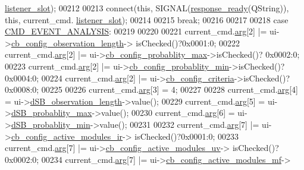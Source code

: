 \begin{DoxyCode}
      \hyperlink{a00004_abb76d8edb39876deb60975c8fd784b3f}{listener\_slot});
00212 
00213             connect(\textcolor{keyword}{this}, SIGNAL(\hyperlink{a00017_a3f6396874778799cf07a7a0149e54977}{response\_ready}(QString)), \textcolor{keyword}{this}, current\_cmd.
      \hyperlink{a00004_abb76d8edb39876deb60975c8fd784b3f}{listener\_slot});
00214 
00215         \textcolor{keywordflow}{break};
00216 
00217 
00218     \textcolor{keywordflow}{case} \hyperlink{a00086_a3a15793e3ab7817f2429edf04de693a0}{CMD\_EVENT\_ANALYSIS}:
00219 
00220 
00221             current\_cmd.\hyperlink{a00004_a56e6c2d7315d0ae60a51e8b140c9cfe4}{arg}[2]     |= ui->\hyperlink{a00080_ae9e8f3f0d147a4cd21c8f36ffb3bd81f}{cb\_config\_observation\_length}->
      isChecked()?0x0001:0;
00222             current\_cmd.\hyperlink{a00004_a56e6c2d7315d0ae60a51e8b140c9cfe4}{arg}[2]     |= ui->\hyperlink{a00080_ad0a7ea02564c112595f0d30efa75eef2}{cb\_config\_probablity\_max}->isChecked()?
      0x0002:0;
00223             current\_cmd.\hyperlink{a00004_a56e6c2d7315d0ae60a51e8b140c9cfe4}{arg}[2]     |= ui->\hyperlink{a00080_a6e32cc42adcf308df94cbbc9ac226f50}{cb\_config\_probablity\_min}->isChecked()?
      0x0004:0;
00224             current\_cmd.\hyperlink{a00004_a56e6c2d7315d0ae60a51e8b140c9cfe4}{arg}[2]     |= ui->\hyperlink{a00080_a89574c631636929702a5928b2a159892}{cb\_config\_criteria}->isChecked()?0x0008:0;
00225 
00226             current\_cmd.\hyperlink{a00004_a56e6c2d7315d0ae60a51e8b140c9cfe4}{arg}[3]      = 4;
00227 
00228             current\_cmd.\hyperlink{a00004_a56e6c2d7315d0ae60a51e8b140c9cfe4}{arg}[4]      = ui->\hyperlink{a00080_a1fe1bf902f2a365c4c94612d2a2ffbcc}{dSB\_observation\_length}->value();
00229             current\_cmd.\hyperlink{a00004_a56e6c2d7315d0ae60a51e8b140c9cfe4}{arg}[5]      = ui->\hyperlink{a00080_a137b79e810736643ac4b15e221909871}{dSB\_probablity\_max}->value();
00230             current\_cmd.\hyperlink{a00004_a56e6c2d7315d0ae60a51e8b140c9cfe4}{arg}[6]      = ui->\hyperlink{a00080_adfd6cf470c736f358c6982f9a635f04f}{dSB\_probablity\_min}->value();
00231 
00232             current\_cmd.\hyperlink{a00004_a56e6c2d7315d0ae60a51e8b140c9cfe4}{arg}[7]     |= ui->\hyperlink{a00080_abef4ef3d5d03026de5d5e172eb0335a6}{cb\_config\_active\_modules\_ir}->
      isChecked()?0x0001:0;
00233             current\_cmd.\hyperlink{a00004_a56e6c2d7315d0ae60a51e8b140c9cfe4}{arg}[7]     |= ui->\hyperlink{a00080_a72ad8a6b100948f9b1438cf3b949be5e}{cb\_config\_active\_modules\_uv}->
      isChecked()?0x0002:0;
00234             current\_cmd.\hyperlink{a00004_a56e6c2d7315d0ae60a51e8b140c9cfe4}{arg}[7]     |= ui->\hyperlink{a00080_abc96d02b5b7a9480a2a142008e99a100}{cb\_config\_active\_modules\_mf}->

\end{DoxyCode}
